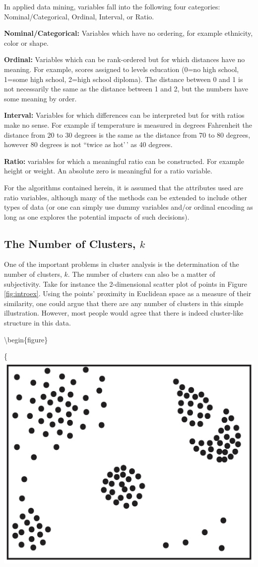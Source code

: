 \documentclass[
]{article}
\theoremstyle{definition}
\theoremstyle{definition}
\theoremstyle{definition}
\theoremstyle{definition}
\theoremstyle{remark}
\begin{document}
In applied data mining, variables fall into the following four categories: Nominal/Categorical, Ordinal, Interval, or Ratio.

\textbf{Nominal/Categorical:} Variables which have no ordering, for example ethnicity, color or shape.

\textbf{Ordinal:} Variables which can be rank-ordered but for which distances have no meaning. For example, scores assigned to levels education (0=no high school, 1=some high school, 2=high school diploma). The distance between 0 and 1 is not necessarily the same as the distance between 1 and 2, but the numbers have some meaning by order.

\textbf{Interval:} Variables for which differences can be interpreted but for with ratios make no sense. For example if temperature is measured in degrees Fahrenheit the distance from 20 to 30 degrees is the same as the distance from 70 to 80 degrees, however 80 degrees is not ``twice as hot'\,' as 40 degrees.

\textbf{Ratio:} variables for which a meaningful ratio can be constructed. For example height or weight. An absolute zero is meaningful for a ratio variable.

For the algorithms contained herein, it is assumed that the attributes used are ratio variables, although many of the methods can be extended to include other types of data (or one can simply use dummy variables and/or ordinal encoding as long as one explores the potential impacts of such decisions).

\hypertarget{the-number-of-clusters-k}{%
\subsection{\texorpdfstring{The Number of Clusters, \(k\)}{The Number of Clusters, k}}\label{the-number-of-clusters-k}}

One of the important problems in cluster analysis is the determination of the number of clusters, \(k\). The number of clusters can also be a matter of subjectivity. Take for instance the 2-dimensional scatter plot of points in Figure \ref{fig:introex}. Using the points' proximity in Euclidean space as a measure of their similarity, one could argue that there are any number of clusters in this simple illustration. However, most people would agree that there is indeed cluster-like structure in this data.

\textbackslash begin\{figure\}

\{\centering \includegraphics[width=0.5\linewidth]{figs/introex}
\end{document}
